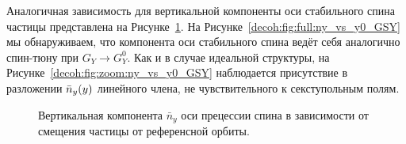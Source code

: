 Аналогичная зависимость для вертикальной компоненты оси стабильного спина частицы представлена на Рисунке~\ref{decoh:fig:ny_vs_y0_GSY}. На Рисунке~\ref{decoh:fig:full:ny_vs_y0_GSY} мы обнаруживаем, что компонента оси стабильного спина ведёт себя аналогично спин-тюну при $G_Y \rightarrow G_Y^0$. Как и в случае идеальной структуры, на Рисунке~\ref{decoh:fig:zoom:ny_vs_y0_GSY} наблюдается присутствие в разложении $\bar n_y(y)$ линейного члена, не чувствительного к секступольным полям.

\begin{figure}[H]
	\centering
	\caption{Вертикальная компонента $\bar n_y$ оси прецессии спина в зависимости от смещения частицы от референсной орбиты.\label{decoh:fig:ny_vs_y0_GSY}}
\end{figure}

